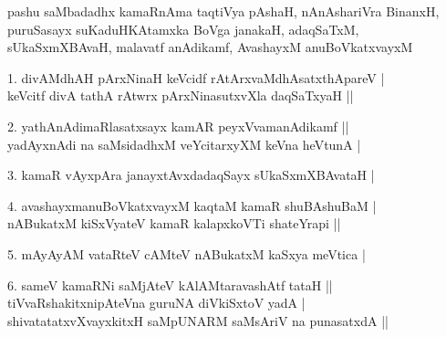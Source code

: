 \begin{entry}
\begin{shl}
\end{shl}
\medskip
{}
\medskip
\begin{shl}
pashu saMbadadhx kamaRnAma taqtiVya pAshaH, nAnAshariVra BinanxH,\\
puruSasayx suKaduHKAtamxka BoVga janakaH, adaqSaTxM,\\
sUkaSxmXBAvaH, malavatf anAdikamf, AvashayxM anuBoVkatxvayxM
\end{shl}
\medskip
\begin{shl}
1. divAMdhAH pArxNinaH keVcidf rAtArxvaMdhAsatxthApareV |\\
keVcitf divA tathA rAtwrx pArxNinasutxvXla daqSaTxyaH ||
\end{shl}
\medskip
{}
\medskip
\begin{shl}
2. yathAnAdimaRlasatxsayx kamAR peyxVvamanAdikamf ||\\
yadAyxnAdi na saMsidadhxM veYcitarxyXM keVna heVtunA |
\end{shl}
\medskip
{}
\medskip
\begin{shl}
3. kamaR vAyxpAra janayxtAvxdadaqSayx sUkaSxmXBAvataH |
\end{shl}
\medskip
{}
\medskip
\begin{shl}
4. avashayxmanuBoVkatxvayxM kaqtaM kamaR shuBAshuBaM |\\
nABukatxM kiSxVyateV kamaR kalapxkoVTi shateYrapi ||
\end{shl}
\medskip
{}
\medskip
\begin{shl}
5. mAyAyAM vataRteV cAMteV nABukatxM kaSxya meVtica |
\end{shl}
\medskip
{}
\medskip
\begin{shl}
6. sameV kamaRNi saMjAteV kAlAMtaravashAtf tataH ||\\
tiVvaRshakitxnipAteVna guruNA diVkiSxtoV yadA |\\
shivatatatxvXvayxkitxH saMpUNARM saMsAriV na punasatxdA ||
\end{shl}
\medskip
{}
\medskip
{}

\end{entry}
